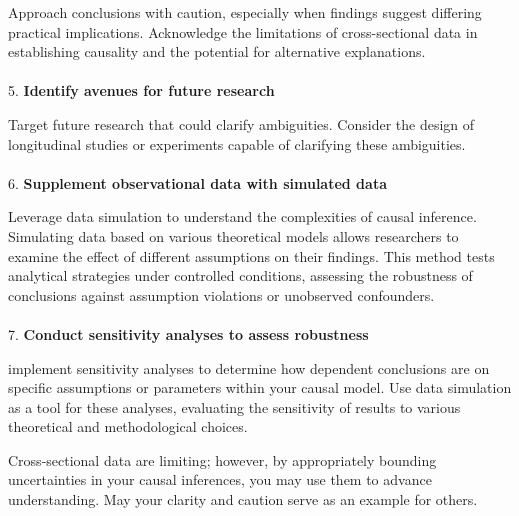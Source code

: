 \documentclass[
  single column]{article}
\makeatletter
\let\oldparagraph\paragraph
\renewcommand{\paragraph}{
    \@ifstar
      \xxxParagraphStar
      \xxxParagraphNoStar
  }
\newcommand{\xxxParagraphStar}[1]{\oldparagraph*{#1}\mbox{}}
\newcommand{\xxxParagraphNoStar}[1]{\oldparagraph{#1}\mbox{}}
\makeatother
\begin{document}
Approach conclusions with caution, especially when findings suggest
differing practical implications. Acknowledge the limitations of
cross-sectional data in establishing causality and the potential for
alternative explanations.

\paragraph{\texorpdfstring{5. \textbf{Identify avenues for future
research}}{5. Identify avenues for future research}}\label{identify-avenues-for-future-research}

Target future research that could clarify ambiguities. Consider the
design of longitudinal studies or experiments capable of clarifying
these ambiguities.

\paragraph{\texorpdfstring{6. \textbf{Supplement observational data with
simulated
data}}{6. Supplement observational data with simulated data}}\label{supplement-observational-data-with-simulated-data}

Leverage data simulation to understand the complexities of causal
inference. Simulating data based on various theoretical models allows
researchers to examine the effect of different assumptions on their
findings. This method tests analytical strategies under controlled
conditions, assessing the robustness of conclusions against assumption
violations or unobserved confounders.

\paragraph{\texorpdfstring{7. \textbf{Conduct sensitivity analyses to
assess
robustness}}{7. Conduct sensitivity analyses to assess robustness}}\label{conduct-sensitivity-analyses-to-assess-robustness}

implement sensitivity analyses to determine how dependent conclusions
are on specific assumptions or parameters within your causal model. Use
data simulation as a tool for these analyses, evaluating the sensitivity
of results to various theoretical and methodological choices.

Cross-sectional data are limiting; however, by appropriately bounding
uncertainties in your causal inferences, you may use them to advance
understanding. May your clarity and caution serve as an example for
others.
\end{document}
